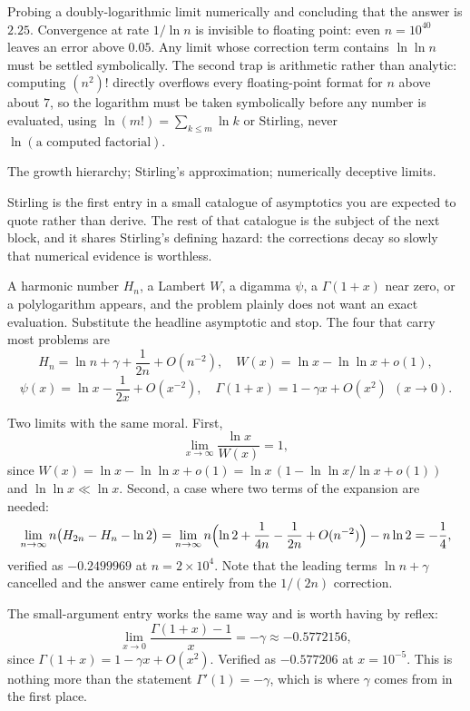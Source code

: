 \begin{trap}
Probing a doubly-logarithmic limit numerically and concluding that the answer is $2.25$. Convergence at rate $1/\ln n$ is invisible to floating point: even $n=10^{40}$ leaves an error above $0.05$. Any limit whose correction term contains $\ln\ln n$ must be settled symbolically. The second trap is arithmetic rather than analytic: computing $(n^{2})!$ directly overflows every floating-point format for $n$ above about $7$, so the logarithm must be taken symbolically before any number is evaluated, using $\ln(m!)=\sum_{k\leq m}\ln k$ or Stirling, never $\ln(\text{a computed factorial})$.
\end{trap}

\begin{seealsob}The growth hierarchy; Stirling's approximation; numerically deceptive limits.\end{seealsob}

Stirling is the first entry in a small catalogue of asymptotics you are expected to quote rather than derive. The rest of that catalogue is the subject of the next block, and it shares Stirling's defining hazard: the corrections decay so slowly that numerical evidence is worthless.

\cue A harmonic number $H_n$, a Lambert $W$, a digamma $\psi$, a $\Gamma(1+x)$ near zero, or a polylogarithm appears, and the problem plainly does not want an exact evaluation.
\method Substitute the headline asymptotic and stop. The four that carry most problems are
\[
H_n=\ln n+\gamma+\frac{1}{2n}+O(n^{-2}),\quad
W(x)=\ln x-\ln\ln x+o(1),
\]
\[
\psi(x)=\ln x-\frac{1}{2x}+O(x^{-2}),\quad
\Gamma(1+x)=1-\gamma x+O(x^{2})\ \ (x\to0).
\]

\begin{worked}
Two limits with the same moral. First,
\[
\lim_{x\to\infty}\frac{\ln x}{W(x)}=1,
\]
since $W(x)=\ln x-\ln\ln x+o(1)=\ln x\,(1-\ln\ln x/\ln x+o(1))$ and $\ln\ln x\ll\ln x$. Second, a case where two terms of the expansion are needed:
\[
\lim_{n\to\infty}n\bigl(H_{2n}-H_n-\ln 2\bigr)
=\lim_{n\to\infty}n\Bigl(\ln 2+\frac{1}{4n}-\frac{1}{2n}+O(n^{-2})\Bigr)-n\ln 2=-\frac14 ,
\]
verified as $-0.2499969$ at $n=2\times10^{4}$. Note that the leading terms $\ln n+\gamma$ cancelled and the answer came entirely from the $1/(2n)$ correction.

The small-argument entry works the same way and is worth having by reflex:
\[
\lim_{x\to0}\frac{\Gamma(1+x)-1}{x}=-\gamma\approx-0.5772156 ,
\]
since $\Gamma(1+x)=1-\gamma x+O(x^{2})$. Verified as $-0.577206$ at $x=10^{-5}$. This is nothing more than the statement $\Gamma'(1)=-\gamma$, which is where $\gamma$ comes from in the first place.
\end{worked}

